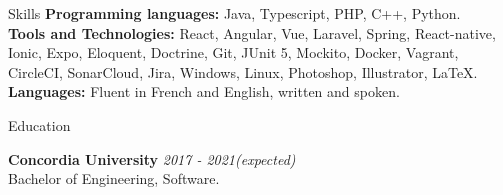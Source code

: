 \documentclass[10pt]{resume} %
\begin{document}
\begin{rSection}{Skills}
{\bf Programming languages:}
Java, Typescript, PHP, C++, Python.\\
{\bf Tools and Technologies:}
React, Angular, Vue, Laravel, Spring, React-native, Ionic, Expo, Eloquent, Doctrine, Git, JUnit 5, Mockito, Docker, Vagrant, CircleCI, SonarCloud, Jira, Windows, Linux, Photoshop, Illustrator, LaTeX. \\
{\bf Languages:}
Fluent in French and English, written and spoken.
\end{rSection}

\begin{rSection}{Education}

{\bf Concordia University} \hfill {\em 2017 - 2021(expected)} 
\\ Bachelor of Engineering, Software.
\end{rSection}
\end{document}
